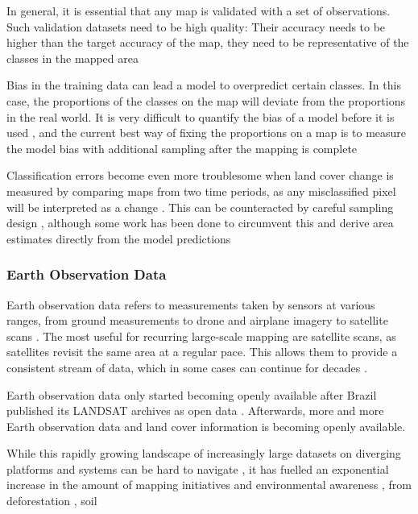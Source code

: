         In general, it is essential that any map is validated with a set of observations. Such validation datasets need to be high quality: Their accuracy needs to be higher than the target accuracy of the map, they need to be representative of the classes in the mapped area 
    
        Bias in the training data can lead a model to overpredict certain classes. In this case, the proportions of the classes on the map will deviate from the proportions in the real world. It is very difficult to quantify the bias of a model before it is used \citep{stehman2013estimating}, and the current best way of fixing the proportions on a map is to measure the model bias with additional sampling after the mapping is complete \citep{stehman2014estimating}

        Classification errors become even more troublesome when land cover change is measured by comparing maps from two time periods, as any misclassified pixel will be interpreted as a change \citep{olofsson2013making}. This can be counteracted by careful sampling design \citep{stehman2012impact,olofsson2014good}, although some work has been done to circumvent this and derive area estimates directly from the model predictions \citep{sales2022land}

    \subsubsection*{Earth Observation Data}

        Earth observation data refers to measurements taken by sensors at various ranges, from ground measurements \citep{shahi2015novel} to drone \citep{tang2015precise} and airplane \citep{mastelic2020aerial} imagery to satellite scans \citep{phiri2020sentinel}. The most useful for recurring large-scale mapping are satellite scans, as satellites revisit the same area at a regular pace. This allows them to provide a consistent stream of data, which in some cases can continue for decades \citep{xiong2020modis,wulder2022fifty}.

        Earth observation data only started becoming openly available after Brazil published its LANDSAT archives as open data \citep{nature2008markets}. Afterwards, more and more Earth observation data and land cover information is becoming openly available. 
    
        While this rapidly growing landscape of increasingly large datasets on diverging platforms and systems can be hard to navigate \citep{wagemann2021a}, it has fuelled an exponential increase in the amount of mapping initiatives and environmental awareness \citep{wulder2022fifty}, from deforestation \citep{hansen2013high}, soil \citep{hengl2017soilgrids250m}
    
